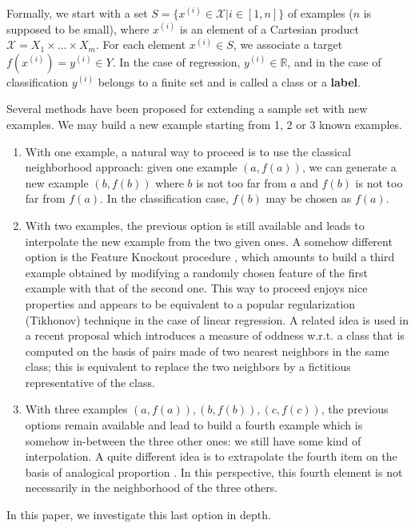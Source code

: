 Formally, we start with a set $S= \{x^{(i)} \in \mathcal{X}| i \in [1,n]\}$ of
examples ($n$ is supposed to be small), where $x^{(i)}$ is an
element of a Cartesian product $\mathcal{X} = X_1 \times \ldots \times X_m$.
For each element  $x^{(i)} \in S$, we associate a target  $f(x^{(i)})=y^{(i)}
\in Y$.  In the case of regression, $y^{(i)} \in \mathbb{R}$, and in the case
of classification $y^{(i)}$ belongs to a finite set and is called a class
or a \textbf{label}.

Several methods have been proposed for extending a sample set with new
examples. We may build a new example starting from
1, 2 or 3 known examples.
\begin{enumerate}
\item With one example, a natural way to proceed is to use the classical
  neighborhood approach: given one  example $(a,f(a))$, we can generate a new
    example $(b,f(b))$ where  $b$ is not too far from $a$ and $f(b)$ is not too
    far from $f(a)$. In the classification case, $f(b)$ may be chosen as
    $f(a)$.
\item With two examples, the previous option is still available and leads to
  interpolate the new example from the two given ones.  A somehow different
    option is the Feature Knockout procedure \cite{WolMar04}, which amounts
    to build a third example obtained by modifying a randomly chosen feature
    of the first example with that of the second one.  This way to
    proceed enjoys nice properties and appears to be equivalent to a popular
    regularization (Tikhonov) technique in the case of linear regression.  A
    related idea is used in a recent proposal \cite{BouPraRicECAI16} which
    introduces a measure of oddness w.r.t. a class that is computed on the
    basis of pairs made of two nearest neighbors in the same class; this is
    equivalent to replace the two neighbors by a fictitious representative of
    the class.

\item With three examples $(a,f(a)), (b,f(b)), (c,f(c))$, the previous options
  remain available and lead to build a fourth example which is somehow
    in-between the three other ones: we still have some kind of interpolation.
    A quite different idea is to extrapolate the fourth item on the basis of
    analogical proportion \cite{BayMouMicAnqECML07}.  In this perspective,
    this fourth element is not necessarily in the neighborhood of the three
    others.
\end{enumerate}
In this paper, we investigate this last option in depth.

